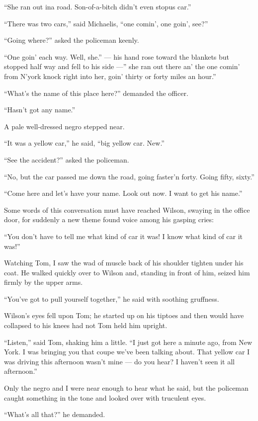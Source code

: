 \documentclass{znotebook}
\begin{document}
``She ran out ina road. Son-of-a-bitch didn't even stopus car.''

``There was two cars,'' said Michaelis, ``one comin', one goin', see?''

``Going where?'' asked the policeman keenly.

``One goin' each way. Well, she.'' ---{} his hand rose toward the blankets but stopped half way and fell to his side ---'' she ran out there an' the one comin' from N'york knock right into her, goin' thirty or forty miles an hour.''

``What's the name of this place here?'' demanded the officer.

``Hasn't got any name.''

A pale well-dressed negro stepped near.

``It was a yellow car,'' he said, ``big yellow car. New.''

``See the accident?'' asked the policeman.

``No, but the car passed me down the road, going faster'n forty. Going fifty, sixty.''

``Come here and let's have your name. Look out now. I want to get his name.''

Some words of this conversation must have reached Wilson, swaying in the office door, for suddenly a new theme found voice among his gasping cries:

``You don't have to tell me what kind of car it was! I know what kind of car it was!''

Watching Tom, I saw the wad of muscle back of his shoulder tighten under his coat. He walked quickly over to Wilson and, standing in front of him, seized him firmly by the upper arms.

``You've got to pull yourself together,'' he said with soothing gruffness.

Wilson's eyes fell upon Tom; he started up on his tiptoes and then would have collapsed to his knees had not Tom held him upright.

``Listen,'' said Tom, shaking him a little. ``I just got here a minute ago, from New York. I was bringing you that coupe we've been talking about. That yellow car I was driving this afternoon wasn't mine ---{} do you hear? I haven't seen it all afternoon.''

Only the negro and I were near enough to hear what he said, but the policeman caught something in the tone and looked over with truculent eyes.

``What's all that?'' he demanded.
\end{document}
